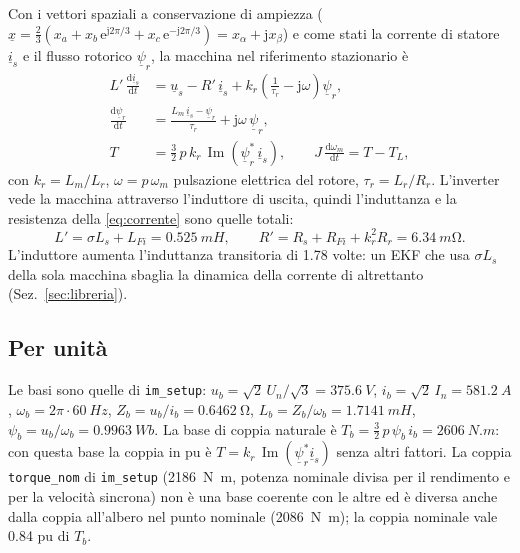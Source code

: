 \documentclass[10pt,a4paper]{scrartcl}
\newcommand{\jj}{\mathrm{j}}
\newcommand{\ee}{\mathrm{e}}
\newcommand{\dif}{\mathrm{d}}
\newcommand{\code}[1]{\texttt{#1}}
\newcommand{\wb}{\omega_b}
\newcommand{\isv}{\underline{i}_s}
\newcommand{\usv}{\underline{u}_s}
\newcommand{\psv}{\underline{\psi}_r}
\newcommand{\kr}{k_r}
\newcommand{\Lp}{L'}
\newcommand{\Rp}{R'}
\newcommand{\taur}{\tau_r}
\renewcommand{\Im}{\operatorname{Im}}
\begin{document}
\begin{onehalfspace}
Con i vettori spaziali a conservazione di ampiezza ($\underline{x} = \tfrac23(x_a + x_b\,\ee^{\jj 2\pi/3} + x_c\,\ee^{-\jj 2\pi/3}) = x_\alpha + \jj x_\beta$) e come stati la corrente di statore $\isv$ e il flusso rotorico $\psv$, la macchina nel riferimento stazionario è
\begin{align}
\Lp\,\frac{\dif \isv}{\dif t} &= \usv - \Rp\,\isv + \kr\left(\frac{1}{\taur} - \jj\omega\right)\psv, \label{eq:corrente}\\
\frac{\dif \psv}{\dif t} &= \frac{L_m\,\isv - \psv}{\taur} + \jj\omega\,\psv, \label{eq:flusso}\\
T &= \frac32\,p\,\kr\,\Im\!\left(\psv^{*}\,\isv\right), \qquad J\,\frac{\dif\omega_m}{\dif t} = T - T_L, \label{eq:meccanica}
\end{align}
con $\kr = L_m/L_r$, $\omega = p\,\omega_m$ pulsazione elettrica del rotore, $\taur = L_r/R_r$. L'inverter vede la macchina attraverso l'induttore di uscita, quindi l'induttanza e la resistenza della \eqref{eq:corrente} sono quelle totali:
\begin{equation}
\Lp = \sigma L_s + L_{Fi} = \SI{0.525}{mH}, \qquad \Rp = R_s + R_{Fi} + \kr^2 R_r = \SI{6.34}{m\ohm}.
\label{eq:lpr}
\end{equation}
L'induttore aumenta l'induttanza transitoria di \num{1.78} volte: un EKF che usa $\sigma L_s$ della sola macchina sbaglia la dinamica della corrente di altrettanto (Sez.~\ref{sec:libreria}).

\subsection{Per unità}
\label{sec:pu}

Le basi sono quelle di \code{im\_setup}: $u_b = \sqrt2\,U_n/\sqrt3 = \SI{375.6}{V}$, $i_b = \sqrt2\,I_n = \SI{581.2}{A}$, $\wb = 2\pi\cdot\SI{60}{Hz}$, $Z_b = u_b/i_b = \SI{0.6462}{\ohm}$, $L_b = Z_b/\wb = \SI{1.7141}{mH}$, $\psi_b = u_b/\wb = \SI{0.9963}{Wb}$. La base di coppia naturale è $T_b = \tfrac32\,p\,\psi_b\,i_b = \SI{2606}{N.m}$: con questa base la coppia in pu è $T = \kr\,\Im(\psv^{*}\isv)$ senza altri fattori. La coppia \code{torque\_nom} di \code{im\_setup} (\SI{2186}{N.m}, potenza nominale divisa per il rendimento e per la velocità sincrona) non è una base coerente con le altre ed è diversa anche dalla coppia all'albero nel punto nominale (\SI{2086}{N.m}); la coppia nominale vale \num{0.84} pu di $T_b$.


\end{onehalfspace}
\end{document}
